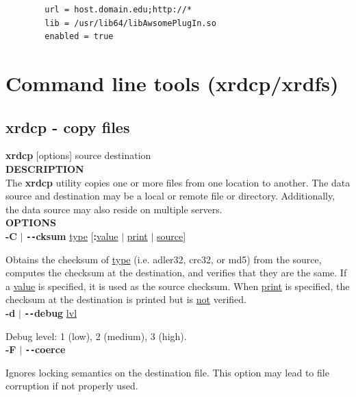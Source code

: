 \documentclass{article}
\begin{document}
	\begin{lstlisting}
		url = host.domain.edu;http://*
		lib = /usr/lib64/libAwsomePlugIn.so
		enabled = true
	\end{lstlisting}


\section{Command line tools (xrdcp/xrdfs)}

    \subsection{xrdcp - copy files}
    
		\textbf{xrdcp} [options] source destination \\
		
		\noindent \textbf{DESCRIPTION} \\
		
		\noindent  The \textbf{xrdcp} utility copies one or more files from one location to
		another. The data source and destination may be a local or remote file or directory.
		Additionally, the data source may also reside on multiple servers. \\
		
		\noindent \textbf{OPTIONS} \\
		
		\noindent \textbf{-C} $\vert$ \textbf{\texttt{-{}-}cksum} \underline{type} [\textbf{:}\underline{value} $\vert$ \underline{print} $\vert$ \underline{source}]
		
		\noindent Obtains the checksum of \underline{type} (i.e. adler32, crc32, or md5) from the source,
		computes the checksum at the destination, and verifies that they are the same. If a \underline{value}
		is specified, it is used as the source checksum. When \underline{print} is specified, the checksum at 
		the destination is printed but is \underline{not} verified. \\
		
		\noindent \textbf{-d} $\vert$ \textbf{\texttt{-{}-}debug} \underline{lvl}
		
		\noindent Debug level: 1 (low), 2 (medium), 3 (high). \\
		
		\noindent \textbf{-F} $\vert$ \textbf{\texttt{-{}-}coerce}

		\noindent Ignores locking semantics on the destination file. This option may lead to
		file corruption if not properly used. \\
		
\end{document}
